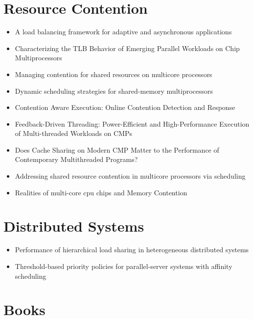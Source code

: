 \section*{Resource Contention}
\label{sec:lr-resource-contention}

\begin{itemize}
\item[\textbullet] A load balancing framework for adaptive and
  asynchronous applications \cite{Barker2004}
\item[\textbullet] Characterizing the TLB Behavior of Emerging
  Parallel Workloads on Chip Multiprocessors \cite{Bhattacharjee2009}
\item[\textbullet] Managing contention for shared resources on
  multicore processors \cite{Fedorova2010}
\item[\textbullet] Dynamic scheduling strategies for shared-memory
  multiprocessors \cite{Hamidzadeh1996}
\item[\textbullet] Contention Aware Execution: Online Contention
  Detection and Response \cite{Soffa2010}
\item[\textbullet] Feedback-Driven Threading: Power-Efficient and
  High-Performance Execution of Multi-threaded Workloads on CMPs
  \cite{Suleman2008}
\item[\textbullet] Does Cache Sharing on Modern CMP Matter to the
  Performance of Contemporary Multithreaded Programs? \cite{Zhang2010}
\item[\textbullet] Addressing shared resource contention in multicore
  processors via scheduling \cite{Zhuravlev2010}
\item[\textbullet] Realities of multi-core cpu chips and Memory
  Contention \cite{Barker2009}
\end{itemize}


\section*{Distributed Systems}
\label{sec:lr-distributed-systems}

\begin{itemize}
\item[\texttimes] Performance of hierarchical load sharing in
  heterogeneous distributed systems \cite{Lo1996}
\item[\texttimes] Threshold-based priority policies for
  parallel-server systems with affinity scheduling
  \cite{Squillante2001}
\end{itemize}


\section*{Books}
\label{sec:lr-books}

